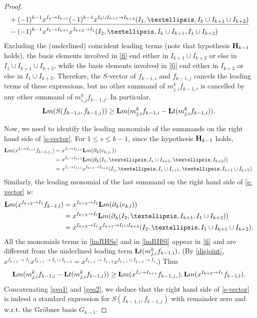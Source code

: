 \documentclass[10pt]{amsart}
\newcommand{\lm}{\mbox{${\bf L}{\rm m}$}}
\newcommand{\lt}{\mbox{${\bf L}{\rm t}$}}
\newcommand{\mbfh}{\mbox{${\bf H}$}}
\newcommand{\dif}{\mbox{$\partial$}}
\theoremstyle{definition}
\theoremstyle{remark}
\begin{document}
\begin{proof}
\begin{align}
&+ \underline{(-1)^{k-1}x^{I_{k}\to
      I_{k+1}}(-1)^{k-1}x^{I_{k}\cup I_{k+1}\to I_{k+2}}(I_1,\ldots
    ,I_{k}\cup I_{k+1}\cup I_{k+2})} \notag \\
  &-(-1)^{k-1}x^{I_{k}\to I_{k+1}}x^{I_{k+2}\to
    I_1}(I_2,\ldots,I_{k}\cup I_{k+1},I_1\cup I_{k+2})\notag
\end{align}
Excluding the (underlined) coincident leading terms (note that
hypothesis $\mbfh_{k-1}$ holds), the basis elements involved in
\eqref{fi} end either in $I_{k+1}\cup I_{k+2}$ or else in $I_1\cup I_{k+1}\cup
I_{k+2}$, while the basis elements involved in \eqref{fj} end either
in $I_{k+2}$ or else in $I_1\cup I_{k+2}$. Therefore, the $S$-vector
of $f_{k-1,i}$ and $f_{k-1,j}$ cancels the leading terms of these
expressions, but no other summand of $m^{k}_{j,i}f_{k-1,i}$ is
cancelled by any other summand of $m^{k}_{i,j}f_{k-1,j}$.  In
particular,
\begin{eqnarray}\label{geq1}
\lm(S(f_{k-1,i},f_{k-1,j}))\geq
\lm(m^{k}_{j,i}f_{k-1,i}-\lt(m^{k}_{j,i}f_{k-1,i})).
\end{eqnarray}

Now, we need to identify the leading monomials of the summands on the
right hand side of \eqref{s-vector}. For $1\leq s\leq k-1$, since the
hypothesis $\mbfh_{k-1}$ holds,
\begin{align}\label{lmRHSs}
\lm(x^{I_s\to I_{s+1}}f_{k-1,j_s})&=x^{I_s\to
    I_{s+1}}\lm(\dif_{k}(e_{k,j_s}))\\
&= x^{I_s\to  I_{s+1}}\lm(\dif_{k}(I_1,\ldots ,I_s\cup I_{s+1},\ldots
  ,I_{k+2}))\notag \\ 
&= x^{I_s\to I_{s+1}}x^{I_{k+1}\to I_{k+2}}
  (I_1,\ldots ,I_s\cup I_{s+1},\ldots ,I_{k+1}\cup I_{k+2}). \notag
\end{align}
Similarly, the leading monomial of the last summand on the right hand
side of \eqref{s-vector} is:
\begin{align}\label{lmRHSl}
\lm(x^{I_{k+2}\to I_{1}}f_{k-1,l})&=x^{I_{k+2}\to
    I_{1}}\lm(\dif_{k}(e_{k,l}))\\
&= x^{I_{k+2}\to     I_{l}}\lm(\dif_{k}(I_2,\ldots ,I_{k+1}, I_{1}\cup I_{k+2}))
  \notag \\
&= x^{I_{k+2}\to I_{1}}x^{I_{k+1}\to I_1\cup I_{k+2}}
  (I_2,\ldots ,I_1\cup I_{k+1}\cup I_{k+2}). \notag
\end{align}
All the monomials terms in \eqref{lmRHSs} and in \eqref{lmRHSl} appear
in \eqref{fi} and are different from the underlined leading term
$\lt(m^{k}_{j,i}f_{k-1,i})$. (By \eqref{disjoint}, $x^{I_{k+2}\to
  I_1}x^{I_{k+1}\to I_1\cup I_{k+2}}=x^{I_{k+1}\to
  I_{k+2}}x^{I_{k+1}\cup I_{k+2}\to I_1}$.)  Thus
\begin{equation}\label{geq2}
\lm(m^{k}_{j,i}f_{k-1,i}-\lt(m^{k}_{j,i}f_{k-1,i}))\geq\lm(x^{I_s\to I_{s+1}}f_{k-1,j_s}),\lm(x^{I_{k+2}\to I_{1}}f_{k-1,l}).
\end{equation}
Concatenating \eqref{geq1} and \eqref{geq2}, we deduce that the right
hand side of \eqref{s-vector} is indeed a standard expression for
$S(f_{k-1,i},f_{k-1,j})$ with remainder zero and w.r.t. the Gr\"obner
basis $G_{k-1}$.


\end{proof}
\end{document}
